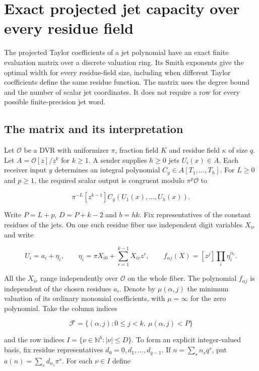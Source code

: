 \documentclass[
  11pt,
]{article}
\begin{document}
\section{Exact projected jet capacity over every residue
field}\label{v8-section-jet-newton-smith}

The projected Taylor coefficients of a jet polynomial have an exact
finite evaluation matrix over a discrete valuation ring. Its Smith
exponents give the optimal width for every residue-field size, including
when different Taylor coefficients define the same residue function. The
matrix uses the degree bound and the number of scalar jet coordinates.
It does not require a row for every possible finite-precision jet word.

\subsection{The matrix and its
interpretation}\label{v8-the-matrix-and-its-interpretation}

Let \(\mathcal O\) be a DVR with uniformizer \(\pi\), fraction field
\(K\) and residue field \(\kappa\) of size \(q\). Let
\(A=\mathcal O[z]/z^k\) for \(k\ge1\). A sender supplies \(h\ge0\) jets
\(U_i(x)\in A\). Each receiver input \(y\) determines an integral
polynomial \(C_y\in A[T_1,\ldots,T_h]\). For \(L\ge0\) and \(p\ge1\),
the required scalar output is congruent modulo \(\pi^p\mathcal O\) to

\[
                 \pi^{-L}[z^{k-1}] C_y(U_1(x),\ldots,U_h(x)).
                 \tag{V8-A1}
\]

Write \(P=L+p\), \(D=P+k-2\) and \(b=hk\). Fix representatives of the
constant residues of the jets. On one such residue fiber use independent
digit variables \(X_{ir}\) and write

\[
 U_i=a_i+\eta_i,\qquad
 \eta_i=\pi X_{i0}+\sum_{r=1}^{k-1}X_{ir}z^r,\qquad
 f_{\alpha j}(X)=[z^j]\prod_i\eta_i^{\alpha_i}.
\]

All the \(X_{ir}\) range independently over \(\mathcal O\) on the whole
fiber. The polynomial \(f_{\alpha j}\) is independent of the chosen
residues \(a_i\). Denote by \(\mu(\alpha,j)\) the minimum valuation of
its ordinary monomial coefficients, with \(\mu=\infty\) for the zero
polynomial. Take the column indices

\[
 \mathcal F=\{(\alpha,j):0\le j<k,\ \mu(\alpha,j)<P\}
\]

and the row indices \(I=\{\nu\in\mathbb N^b:|\nu|\le D\}\). To form an
explicit integer-valued basis, fix residue representatives
\(d_0=0,d_1,\ldots,d_{q-1}\). If \(n=\sum_s n_s q^s\), put
\(a(n)=\sum_s d_{n_s}\pi^s\). For each \(\nu\in I\) define
\end{document}
